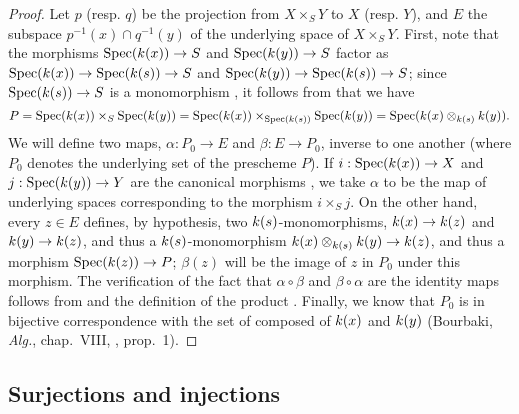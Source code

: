 \begin{proof}
\label{proof-I.3.4.9}
Let $p$ (resp. $q$) be the projection from $X\times_S Y$ to $X$ (resp. $Y$), and $E$ the subspace $p^{-1}(x)\cap q^{-1}(y)$ of the underlying space of $X\times_S Y$.
First, note that the morphisms $\Spec(\kres(x))\to S$ and $\Spec(\kres(y))\to S$ factor as $\Spec(\kres(x))\to\Spec(\kres(s))\to S$ and $\Spec(\kres(y))\to\Spec(\kres(s))\to S$; since $\Spec(\kres(s))\to S$ is a monomorphism , it follows from  that we have
\[
  P=\operatorname{Spec}(k(x))\times_S\operatorname{Spec}(k(y))=\operatorname{Spec}(k(x))\times_{\operatorname{Spec}(k(s))}\operatorname{Spec}(k(y))=\operatorname{Spec}(k(x)\otimes_{k(s)}k(y)).
\]
We will define two maps, $\alpha:P_0\to E$ and $\beta:E\to P_0$, inverse to one another (where $P_0$ denotes the underlying set of the prescheme $P$).
If $i:\Spec(\kres(x))\to X$ and $j:\Spec(\kres(y))\to Y$ are the canonical morphisms , we take $\alpha$ to be the map of underlying spaces corresponding to the morphism $i\times_S j$.
On the other hand, every $z\in E$ defines, by hypothesis, two $k(s)$-monomorphisms, $\kres(x)\to\kres(z)$ and $\kres(y)\to\kres(z)$, and thus a $k(s)$-monomorphism $\kres(x)\otimes_{\kres(s)}\kres(y)\to\kres(z)$, and thus a morphism $\Spec(\kres(z))\to P$; $\beta(z)$ will be the image of $z$ in $P_0$ under this morphism.
The verification of the fact that $\alpha\circ\beta$ and $\beta\circ\alpha$ are the identity maps follows from  and the definition of the product .
Finally, we know that $P_0$ is in bijective correspondence with the set of  composed of $k(x)$ and $k(y)$ (Bourbaki, \emph{Alg.}, chap.~VIII, , prop.~1).
\end{proof}

\subsection{Surjections and injections}
\label{subsection:I.3.5}

